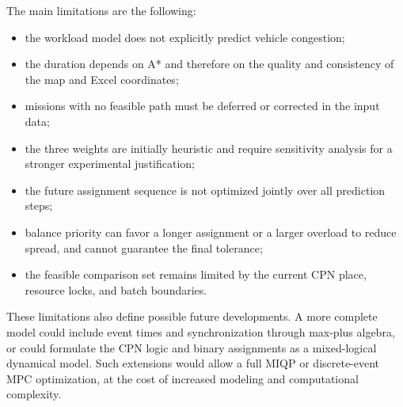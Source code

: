 The main limitations are the following:
\begin{itemize}
	\item the workload model does not explicitly predict vehicle congestion;
	\item the duration depends on A* and therefore on the quality and
	consistency of the map and Excel coordinates;
	\item missions with no feasible path must be deferred or corrected in the
	input data;
	\item the three weights are initially heuristic and require sensitivity
	analysis for a stronger experimental justification;
	\item the future assignment sequence is not optimized jointly over all
	prediction steps;
	\item balance priority can favor a longer assignment or a larger
	overload to reduce spread, and cannot guarantee the final tolerance;
	\item the feasible comparison set remains limited by the current CPN
	place, resource locks, and batch boundaries.
\end{itemize}

These limitations also define possible future developments. A more complete
model could include event times and synchronization through max-plus algebra,
or could formulate the CPN logic and binary assignments as a mixed-logical
dynamical model. Such extensions would allow a full MIQP or discrete-event
MPC optimization, at the cost of increased modeling and computational
complexity.

